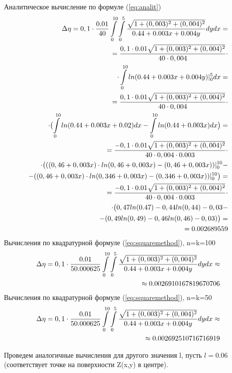 \documentclass{article}
\begin{document}
Аналитическое вычисление по формуле (\ref{eq:analit})
\begin{align} \label{eq:analit1:min}
\Delta \eta = 0,1 \cdot \frac{0.01}{40} \int\limits_0^{10} \int\limits_0^5 \frac{\sqrt{1+(0,003)^2+(0,004)^2}}{0.44 + 0.003x + 0.004y} dy dx = \notag \\
= \frac{0,1 \cdot 0.01\sqrt{1+(0,003)^2+(0,004)^2}}{40 \cdot 0,004} \cdot \notag \\
\cdot \int\limits_0^{10} ln(0.44 + 0.003x + 0.004y)|_0^5 dx = \notag \\
= \frac{0,1 \cdot 0.01\sqrt{1+(0,003)^2+(0,004)^2}}{40 \cdot 0,004} \cdot \notag \\
\cdot \bigl(\int\limits_0^{10} ln(0.44 + 0.003x + 0.02)dx - \int\limits_0^{10} ln(0.44 + 0.003x)dx \bigr) = \notag \\
= \frac{-0,1 \cdot 0.01\sqrt{1+(0,003)^2+(0,004)^2}}{40 \cdot 0,004 \cdot 0.003} \cdot \notag \\
\cdot \bigl(((0,46+0,003x) \cdot ln(0,46+0,003x) - (0,46+0,003x))|_0^{10} - \notag \\
- ((0,46+0,003x) \cdot ln(0,346+0,003x) - (0,346+0,003x))|_0^{10}\bigr) = \notag \\
= \frac{-0,1 \cdot 0.01\sqrt{1+(0,003)^2+(0,004)^2}}{40 \cdot 0,004 \cdot 0.003} \cdot \notag \\
\cdot \bigl(0,47 ln(0.47)-0,44ln(0,44)-0,03- \notag \\
- (0,49ln(0,49)-0,46ln(0,46)-0,03)\bigr) = \notag \\
= 0.002689559
\end{align}
Вычисления по квадратурной формуле (\ref{eq:squaremethod}), n=k=100
\begin{align}\label{eq:sq1min10}
\Delta \eta = 0,1 \cdot \frac{0.01}{50.000625} \int\limits_0^{10} \int\limits_0^5 \frac{\sqrt{1+(0,003)^2+(0,004)^2}}{0.44 + 0.003x + 0.004y} dy dx \approx \notag \\ \approx 0.0026910167819670706
\end{align}
Вычисления по квадратурной формуле (\ref{eq:squaremethod}), n=k=50
\begin{align}\label{eq:sq1min5}
\Delta \eta = 0,1 \cdot \frac{0.01}{50.000625} \int\limits_0^{10} \int\limits_0^5 \frac{\sqrt{1+(0,003)^2+(0,004)^2}}{0.44 + 0.003x + 0.004y} dy dx \approx \notag \\ \approx 0.002692510716716919
\end{align}

Проведем аналогичные вычисления для другого значения l, пусть $l=0.06$ (соответствует точке на поверхности Z(x,y) в центре).
\end{document}
